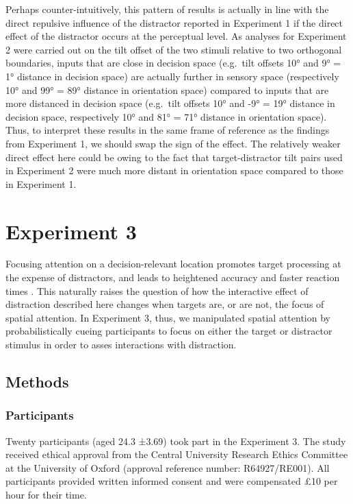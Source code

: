 \documentclass[a4paper, nobind]{templates/ociamthesis}
\begin{document}
Perhaps counter-intuitively, this pattern of results is actually in line with the direct repulsive influence of the distractor reported in Experiment 1 if the direct effect of the distractor occurs at the perceptual level. As analyses for Experiment 2 were carried out on the tilt offset of the two stimuli relative to two orthogonal boundaries, inputs that are close in decision space (e.g.~tilt offsets 10° and 9° = 1° distance in decision space) are actually further in sensory space (respectively 10° and 99° = 89° distance in orientation space) compared to inputs that are more distanced in decision space (e.g.~tilt offsets 10° and -9° = 19° distance in decision space, respectively 10° and 81° = 71° distance in orientation space). Thus, to interpret these results in the same frame of reference as the findings from Experiment 1, we should swap the sign of the effect. The relatively weaker direct effect here could be owing to the fact that target-distractor tilt pairs used in Experiment 2 were much more distant in orientation space compared to those in Experiment 1.

\hypertarget{experiment-3}{%
\section{Experiment 3}\label{experiment-3}}

Focusing attention on a decision-relevant location promotes target processing at the expense of distractors, and leads to heightened accuracy and faster reaction times \autocite{posner1980,hawkins1990,carrasco2011}. This naturally raises the question of how the interactive effect of distraction described here changes when targets are, or are not, the focus of spatial attention. In Experiment 3, thus, we manipulated spatial attention by probabilistically cueing participants to focus on either the target or distractor stimulus in order to asses interactions with distraction.

\hypertarget{methods-5}{%
\subsection{Methods}\label{methods-5}}

\hypertarget{participants-3}{%
\subsubsection{Participants}\label{participants-3}}

Twenty participants (aged 24.3 ±3.69) took part in the Experiment 3. The study received ethical approval from the Central University Research Ethics Committee at the University of Oxford (approval reference number: R64927/RE001). All participants provided written informed consent and were compensated £10 per hour for their time.
\end{document}
